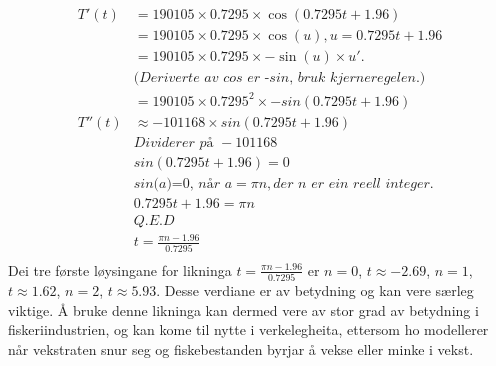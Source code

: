 \documentclass{report}
\begin{document}
\begin{align*}
	T'(t)  & = 190105 \times 0.7295 \times \cos(0.7295t+1.96)                      \\
	       & = 190105 \times 0.7295 \times \cos(u), u=0.7295t+1.96                 \\
	       & = 190105 \times 0.7295 \times -\sin(u) \times u'.                     \\
	       & \textit{(Deriverte av cos er -sin, bruk kjerneregelen.)}              \\
	       & = 190105\times 0.7295^{2}\times -sin(0.7295t+1.96)                    \\
	T''(t) & \approx -101168 \times sin(0.7295t+1.96)                              \\
	       & \textit{Dividerer på } -101168                                        \\
	       & sin(0.7295t+1.96) = 0                                                 \\
	       & \textit{sin(a)=0, når } a=\pi n, \textit{der n er ein reell integer.} \\
	       & 0.7295t+1.96 =\pi n                                                   \\
	       & Q.E.D                                                                 \\
	       & t= \frac{\pi n -1.96}{0.7295}                                         \\
\end{align*}
Dei tre første løysingane for likninga $t=\frac{\pi n -1.96}{0.7295}$ er $n=0$, $t\approx -2.69$, $n=1$, $t\approx 1.62$, $n=2$, $t\approx 5.93$. Desse verdiane er av betydning og kan vere særleg viktige. Å bruke denne likninga kan dermed vere av stor grad av betydning i fiskeriindustrien, og kan kome til nytte i verkelegheita, ettersom ho modellerer når vekstraten snur seg og fiskebestanden byrjar å vekse eller minke i vekst.
\end{document}
